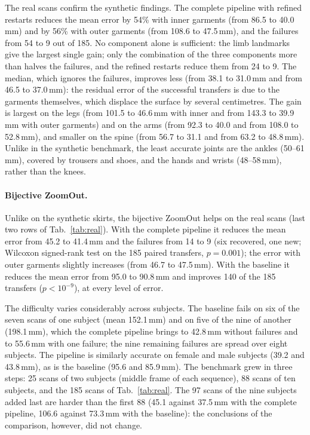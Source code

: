 \documentclass[11pt]{article}
\begin{document}
The real scans confirm the synthetic findings. The complete pipeline with
refined restarts reduces the mean error by 54\% with inner garments (from
86.5 to 40.0\,mm) and by 56\% with outer garments (from 108.6 to 47.5\,mm), and
the failures from 54 to 9 out of 185. No component alone is sufficient: the
limb landmarks give the largest single gain; only the combination of the three
components more than halves the failures, and the refined restarts reduce
them from 24 to 9.
The median, which ignores the failures, improves less (from 38.1 to 31.0\,mm
and from 46.5 to 37.0\,mm): the residual error of the successful transfers is
due to the garments themselves, which displace the surface by several
centimetres. The gain is largest on the legs (from 101.5 to 46.6\,mm with
inner and from 143.3 to 39.9\,mm with outer garments) and on the arms (from
92.3 to 40.0 and from 108.0 to 52.8\,mm), and smaller on the spine (from 56.7
to 31.1 and from 63.2 to 48.8\,mm). Unlike in the synthetic benchmark, the
least accurate joints are the ankles (50--61\,mm), covered by trousers and
shoes, and the hands and wrists (48--58\,mm), rather than the knees.

\paragraph{Bijective ZoomOut.} Unlike on the synthetic skirts, the bijective
ZoomOut helps on the real scans (last two rows of Tab.~\ref{tab:real}). With
the complete pipeline it reduces the mean error from 45.2 to 41.4\,mm and the
failures from 14 to 9 (six recovered, one new; Wilcoxon signed-rank test on the
185 paired transfers, $p = 0.001$); the error with outer garments slightly
increases (from 46.7 to 47.5\,mm). With the baseline it reduces the mean error
from 95.0 to 90.8\,mm and improves 140 of the 185 transfers ($p < 10^{-9}$),
at every level of error.

The difficulty varies considerably across subjects. The baseline fails on six
of the seven scans of one subject (mean 152.1\,mm) and on five of the nine of
another (198.1\,mm), which the complete pipeline brings to 42.8\,mm without
failures and to 55.6\,mm with one failure; the nine remaining failures are
spread over eight subjects. The pipeline is similarly accurate on female
and male subjects (39.2 and 43.8\,mm), as is the baseline (95.6 and
85.9\,mm). The benchmark grew in three steps: 25 scans of two subjects
(middle frame of each sequence), 88 scans of ten subjects, and the 185 scans
of Tab.~\ref{tab:real}. The 97 scans of the nine subjects added last are
harder than the first 88 (45.1 against 37.5\,mm with the complete pipeline,
106.6 against 73.3\,mm with the baseline): the conclusions of the comparison,
however, did not change.
\end{document}
